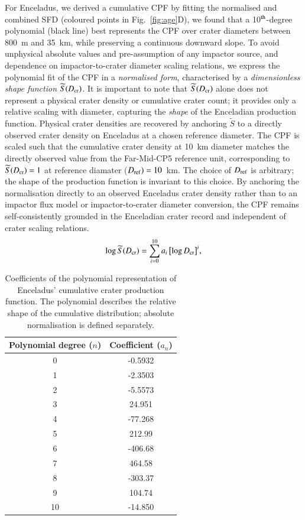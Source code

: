 \documentclass[preprint,11pt,3p,times,authoryear]{elsarticle}
\begin{document}
For Enceladus, we derived a cumulative CPF by fitting the normalised and combined SFD (coloured points in Fig.~\ref{fig:age}D), we found that a 10$^{\rm th}$-degree polynomial (black line) best represents the CPF over crater diameters between 800~m and 35~km, while preserving a continuous downward slope. 
To avoid unphysical absolute values and pre-assumption of any impactor source, and dependence on impactor-to-crater diameter scaling relations, we express the polynomial fit of the CPF in a \emph{normalised form}, characterised by a \emph{dimensionless shape function} $\widetilde{S}(D_{\rm cr})$. It is important to note that $\widetilde{S}(D_{\rm cr})$ alone does not represent a physical crater density or cumulative crater count; it provides only a relative scaling with diameter, capturing the \emph{shape} of the Enceladian production function. Physical crater densities are recovered by anchoring $\widetilde{S}$ to a directly observed crater density on Enceladus at a chosen reference diameter.
The CPF is scaled such that the cumulative crater density at 10~km diameter matches the directly observed value from the Far-Mid-CP5 reference unit, corresponding to $\widetilde{S}(D_{\rm cr}) = 1$ at reference diamater ($D_{\rm ref}) = 10$~km. The choice of $D_{\rm ref}$ is arbitrary; the shape of the production function is invariant to this choice. By anchoring the normalisation directly to an observed Enceladus crater density rather than to an impactor flux model or impactor-to-crater diameter conversion, the CPF remains self-consistently grounded in the Enceladian crater record and independent of crater scaling relations.
\begin{equation}
    \log \widetilde{S}(D_{\rm cr}) = \sum_{i=0}^{10} a_i \, \bigl[\log D_{\rm cr}\bigr]^i,
    \label{eq:cpf_scale}
\end{equation}

\begin{table}[H]%
\centering
\begin{tabular}{cc}
\hline
  \textbf{Polynomial degree ($n$)} & \textbf{Coefficient ($a_n$)} \\
\hline
0 & -0.5932  \\
1 & -2.3503 \\
2 & -5.5573 \\
3 & 24.951  \\
4 & -77.268 \\
5 & 212.99  \\
6 & -406.68 \\
7 & 464.58  \\
8 & -303.37 \\
9 & 104.74  \\
10 & -14.850 \\
\hline
\end{tabular}
\caption{Coefficients of the polynomial representation of Enceladus’ cumulative crater production function. The polynomial describes the relative shape of the cumulative distribution; absolute normalisation is defined separately.}
\label{tab:cpf}
\end{table}
\end{document}
